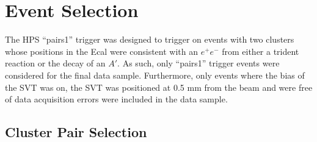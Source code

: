 \section{Event Selection}

The HPS ``pairs1'' trigger was designed to trigger on events with two clusters
whose positions in the Ecal were consistent with an $e^+e^-$ from either a trident 
reaction or the decay of an $A'$. As such, only ``pairs1'' trigger events
were considered for the final data sample.  Furthermore, only events where the
bias of the SVT was on, the SVT was positioned at 0.5 mm from the beam and 
were free of data acquisition errors were included in the data sample.

\subsection{Cluster Pair Selection}

